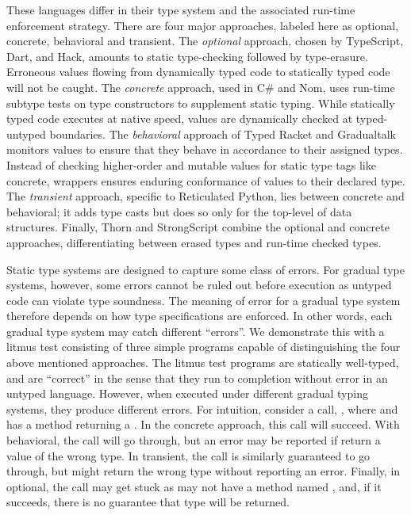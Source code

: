 \documentclass[USenglish]{tex/lipics-v2016}
\begin{document}
\noindent These languages differ in their type system and the associated
run-time enforcement strategy. There are four major approaches, labeled here
as optional, concrete, behavioral and transient. The \emph{optional}
approach, chosen by TypeScript, Dart, and Hack, amounts to static
type-checking followed by type-erasure.  Erroneous values flowing from
dynamically typed code to statically typed code will not be caught. The
\emph{concrete} approach, used in C\# and Nom, uses run-time subtype tests
on type constructors to supplement static typing.  While statically typed
code executes at native speed, values are dynamically checked at
typed-untyped boundaries. The \emph{behavioral} approach of Typed Racket and
Gradualtalk monitors values to ensure that they behave in accordance to
their assigned types. Instead of checking higher-order and mutable values
for static type tags like concrete, wrappers ensures enduring conformance of
values to their declared type.  The \emph{transient} approach, specific to
Reticulated Python, lies between concrete and behavioral; it adds type casts
but does so only for the top-level of data structures. Finally, Thorn and
StrongScript combine the optional and concrete approaches, differentiating
between erased types and run-time checked types.

Static type systems are designed to capture some class of errors. For
gradual type systems, however, some errors cannot be ruled out before
execution as untyped code can violate type soundness. The meaning of error
for a gradual type system therefore depends on how type specifications are
enforced.  In other words, each gradual type system may catch different
``errors''.  We demonstrate this with a litmus test consisting of three
simple programs capable of distinguishing the four above mentioned
approaches.  The litmus test programs are statically well-typed, and are
``correct'' in the sense that they run to completion without error in an
untyped language. However, when executed under different gradual typing
systems, they produce different errors. For intuition, consider a call,
, where \EM{\x:\C} and \C has a method \m returning a \D.  In
the concrete approach, this call will succeed. With behavioral, the call
will go through, but an error may be reported if \m return a value of the
wrong type. In transient, the call is similarly guaranteed to go through,
but might return the wrong type without reporting an error.  Finally, in
optional, the call may get stuck as \x may not have a method named \m, and,
if it succeeds, there is no guarantee that type \D will be returned.
\end{document}
